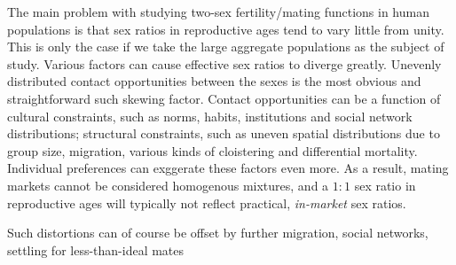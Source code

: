 
The main problem with studying two-sex fertility/mating functions in human
populations is that sex ratios in reproductive ages tend to vary little from
unity. This is only the case if we take the large aggregate populations as the
subject of study. Various factors can cause effective sex ratios to diverge
greatly. Unevenly distributed contact opportunities between the sexes is the
most obvious and straightforward such skewing factor. Contact opportunities can
be a function of cultural constraints, such as norms, habits, institutions and
social network distributions; structural constraints, such as uneven spatial
distributions due to group size, migration, various kinds of cloistering and
differential mortality. Individual preferences can exggerate these factors even 
more. As a result, mating markets cannot be considered homogenous mixtures, and 
a $1:1$ sex ratio in reproductive ages will typically not reflect practical,
\textit{in-market} sex ratios.

Such distortions can of course be offset by further migration, social networks,
settling for less-than-ideal mates

